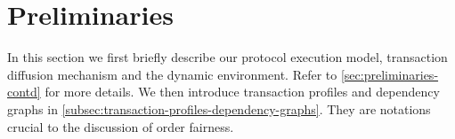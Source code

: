 \section{Preliminaries} \label{sec:preliminaries}

In this section we first briefly describe our protocol execution model, transaction diffusion mechanism and the dynamic environment.
%
Refer to \cref{sec:preliminaries-contd} for more details.
%
We then introduce transaction profiles and dependency graphs in \cref{subsec:transaction-profiles-dependency-graphs}.
%
They are notations crucial to the discussion of order fairness.




